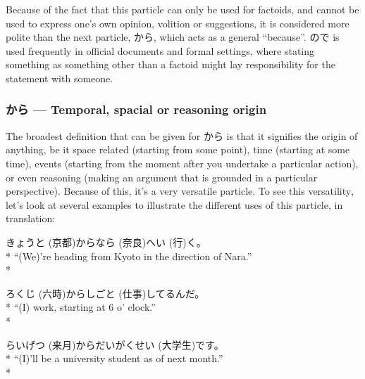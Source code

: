 \documentclass[11pt, b5paper, twoside, openright, onecolumn]{book}
\makeatletter
\newcommand*{\rubystack}[2]{{\relscale{0.5}%
  \begin{tabular}[b]{@{}c@{}}%
    {#1}\\%
   {\textscale{2}{#2}}%
  \end{tabular}}%
}
\DeclareRobustCommand*{\ruby}[2]{%
  \mbox{%
    \setlength{\parskip}{0ex}%
    \BeginAccSupp{method=pdfstringdef,ActualText={#1}}%
      \rubystack{\phantom{#2}}{#1}%
      \llap{%
        \rubystack{#2}{\phantom{#1}}%
      }%
    \EndAccSupp{}%
  }%
}
\renewcommand*{\ruby}[2]{#2 (#1)}%
\newenvironment{exampleblock}{
\setlength{\parindent}{0.6in}
\begin{minipage}[t]{\dimexpr\textwidth-\parindent}}
{\end{minipage}}
\makeatother
\begin{document}
Because of the fact that this particle can only be used for factoids‚ and cannot be used to express one’s own opinion‚ volition or suggestions‚ it is considered more polite than the next particle‚ から‚ which acts as a general “because”. ので is used frequently in official documents and formal settings‚ where stating something as something other than a factoid might lay responsibility for the statement with someone.

\subsubsection{から — Temporal‚ spacial or reasoning origin}

The broadest definition that can be given for から is that it signifies the origin of anything‚ be it space related (starting from some point)‚ time (starting at some time)‚ events (starting from the moment after you undertake a particular action)‚ or even reasoning (making an argument that is grounded in a particular perspective). Because of this‚ it’s a very versatile particle. To see this versatility‚ let’s look at several examples to illustrate the different uses of this particle‚ in translation:

\vspace{0.4cm}
\begin{exampleblock}
\ruby{京都}{きょうと}から\ruby{奈良}{なら}へ\ruby{行}{い}く。 \\* 
“(We)’re heading from Kyoto in the direction of Nara.” \\* 
\end{exampleblock}
\vspace{0.2cm}

\begin{exampleblock}
\ruby{六時}{ろくじ}から\ruby{仕事}{しごと}してるんだ。 \\* 
“(I) work‚ starting at 6 o’ clock.” \\* 
\end{exampleblock}
\vspace{0.2cm}

\begin{exampleblock}
\ruby{来月}{らいげつ}から\ruby{大学生}{だいがくせい}です。 \\* 
“(I)’ll be a university student as of next month.” \\* 
\end{exampleblock}
\vspace{0.2cm}
\end{document}

